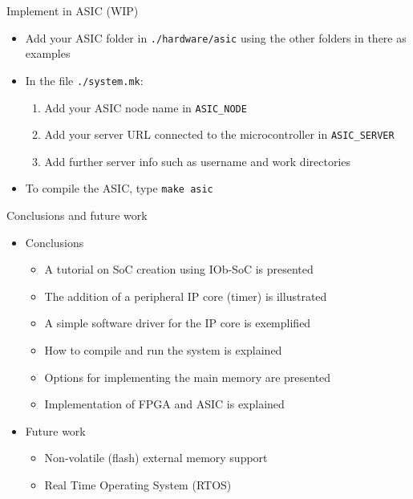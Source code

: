 \documentclass [xcolor=svgnames, t] {beamer}
\begin{document}
\begin{frame}{Implement in ASIC (WIP)}
\begin{itemize}
  \item Add your ASIC folder in {\tt ./hardware/asic} using the other folders in there as examples
  \item In the file {\tt ./system.mk}:
  \begin{enumerate}
     \item Add your ASIC node name in {\tt ASIC\_NODE}    
     \item Add your server URL connected to the microcontroller in {\tt ASIC\_SERVER}   
     \item Add further server info such as username and work directories
  \end{enumerate}
  \item To compile the ASIC, type {\tt make asic}
\end{itemize}
\end{frame}


\begin{frame}{Conclusions and future work}

\begin{itemize}
  \item Conclusions
    \begin{itemize}
    \item A tutorial on SoC creation using IOb-SoC is presented
    \item The addition of a peripheral IP core (timer) is illustrated
    \item A simple software driver for the IP core is exemplified
    \item How to compile and run the system is explained 
    \item Options for implementing the main memory are presented
    \item Implementation of FPGA and ASIC is explained
    \end{itemize}
  \item Future work
    \begin{itemize}
    \item Non-volatile (flash) external memory support
    \item Real Time Operating System (RTOS) 
    \end{itemize}
\end{itemize}

\end{frame}

\end{document}

